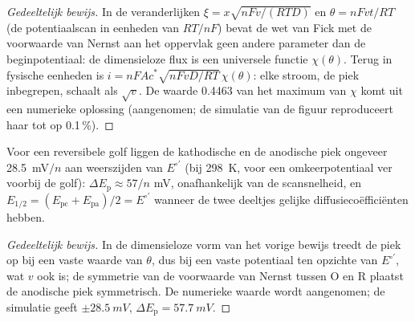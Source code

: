 \begin{proof}[Gedeeltelijk bewijs]
In de veranderlijken $\xi = x\sqrt{nFv/(RTD)}$ en $\theta = nFvt/RT$ (de potentiaalscan in eenheden van
$RT/nF$) bevat de wet van Fick met de voorwaarde van Nernst aan het
oppervlak geen andere parameter dan de beginpotentiaal: de dimensieloze
flux is een universele functie $\chi(\theta)$. Terug in fysische eenheden is $i = nFAc^*\sqrt{nFvD/RT}\,\chi(\theta)$: elke
stroom, de piek inbegrepen, schaalt als $\sqrt v$. De waarde 0.4463 van het
maximum van
$\chi$ komt uit een numerieke oplossing (aangenomen; de simulatie van de
figuur reproduceert haar tot op 0.1\,\%).
\end{proof}

\begin{proposition}[Piekscheiding]\label{prop:b3:electrode-kinetics:delta-ep}
Voor een reversibele golf liggen de kathodische en de anodische piek
ongeveer \qty{28.5}{mV}$/n$
aan weerszijden van $E^{\circ\prime}$ (bij \qty{298}{K}, voor een
omkeerpotentiaal ver voorbij de golf):
$\Delta E_{\mathrm p} \approx 57/n$ mV, onafhankelijk van de scansnelheid, en $E_{1/2} = (E_{\mathrm{pc}} + E_{\mathrm{pa}})/2 =
E^{\circ\prime}$ wanneer de twee deeltjes gelijke diffusiecoëfficiënten hebben.
\end{proposition}

\begin{proof}[Gedeeltelijk bewijs]
In de dimensieloze vorm van het vorige bewijs treedt de piek op bij een
vaste waarde van $\theta$, dus bij een vaste potentiaal ten opzichte van
$E^{\circ\prime}$, wat $v$ ook is; de symmetrie van de voorwaarde van Nernst
tussen O en R plaatst de anodische piek symmetrisch. De numerieke waarde
wordt aangenomen; de simulatie geeft
$\pm\qty{28.5}{mV}$, $\Delta E_{\mathrm p} = \qty{57.7}{mV}$.
\end{proof}

